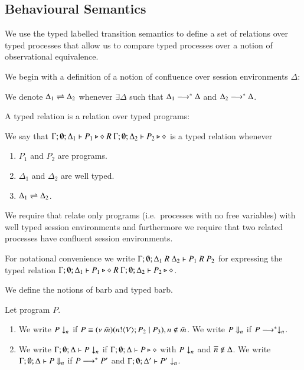 \subsection{Behavioural Semantics}

We use the typed labelled transition semantics to define
a set of relations over typed processes that allow us to compare
typed processes over a notion of observational equivalence.


We begin with a definition of a notion of confluence
over session environments $\Delta$:
%
\begin{definition}\rm
	We denote $\Delta_1 \rightleftharpoons \Delta_2$ whenever $\exists \Delta$ such that
	$\Delta_1 \longrightarrow^* \Delta$ and $\Delta_2 \longrightarrow^* \Delta$.
\end{definition}
%
A typed relation is a relation over typed programs:

\begin{definition}\rm
	We say that
	$\Gamma; \emptyset; \Delta_1 \vdash P_1 \triangleright \diamond\ R\ \Gamma; \emptyset; \Delta_2 \vdash P_2 \triangleright \diamond$
	is a typed relation whenever
	\begin{enumerate}
		\item	$P_1$ and $P_2$ are programs.
		\item	$\Delta_1$ and $\Delta_2$ are well typed.
		\item	$\Delta_1 \rightleftharpoons \Delta_2$.
	\end{enumerate}
\end{definition}

We require that relate only programs (i.e.\ processes with no free variables) with
well typed session environments and furthermore we require that two related processes
have confluent session environments.

For notational convenience we write
$\horel{\Gamma}{\Delta_1}{P_1}{\ R\ }{\Delta_2}{P_2}$
for expressing the typed relation $\Gamma; \emptyset; \Delta_1 \vdash P_1 \triangleright \diamond\ R\ \Gamma; \emptyset; \Delta_2 \vdash P_2 \triangleright \diamond$.

We define the notions of barb and typed barb.

\begin{definition}[Barbs]\rm
	Let program $P$.
	\begin{enumerate}
		\item	We write $P \downarrow_{n}$ if $P \equiv (\nu\ \tilde{m})(n ! \langle V \rangle ; P_2 \;|\; P_3), n \notin \tilde{m}$.
			We write $P \Downarrow_{n}$ if $P \longrightarrow^* \downarrow_{n}$.

		\item	We write $\Gamma; \emptyset; \Delta \vdash P \downarrow_{n}$ if
			$\Gamma; \emptyset; \Delta \vdash P \triangleright \diamond$ with $P \downarrow_{n}$ and $\overline{n} \notin \Delta$.
			We write $\Gamma; \emptyset; \Delta \vdash P \Downarrow_{n}$ if $P \longrightarrow^* P'$ and
			$\Gamma; \emptyset; \Delta' \vdash P' \downarrow_{n}$.			
	\end{enumerate}
\end{definition}

